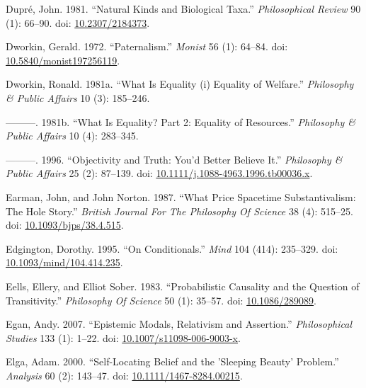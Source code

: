 \documentclass[
  10pt,
  letterpaper,
  DIV=11,
  numbers=noendperiod,
  twoside]{scrartcl}
\newlength{\cslhangindent}
\newenvironment{CSLReferences}[2] %
 {\begin{list}{}{%
  \setlength{\itemindent}{0pt}
  \setlength{\leftmargin}{0pt}
  \setlength{\parsep}{0pt}
  \ifodd #1
   \setlength{\leftmargin}{\cslhangindent}
   \setlength{\itemindent}{-1\cslhangindent}
  \fi
  \setlength{\itemsep}{#2\baselineskip}}}
 {\end{list}}
\begin{document}
\begin{CSLReferences}{1}{0}
Dupré, John. 1981. {``Natural Kinds and Biological Taxa.''}
\emph{Philosophical Review} 90 (1): 66--90. doi:
\href{https://doi.org/10.2307/2184373}{10.2307/2184373}.

Dworkin, Gerald. 1972. {``Paternalism.''} \emph{Monist} 56 (1): 64--84.
doi:
\href{https://doi.org/10.5840/monist197256119}{10.5840/monist197256119}.

Dworkin, Ronald. 1981a. {``What Is Equality (i) Equality of Welfare.''}
\emph{Philosophy \& Public Affairs} 10 (3): 185--246.

---------. 1981b. {``What Is Equality? Part 2: Equality of Resources.''}
\emph{Philosophy \& Public Affairs} 10 (4): 283--345.

---------. 1996. {``Objectivity and Truth: You'd Better Believe It.''}
\emph{Philosophy \& Public Affairs} 25 (2): 87--139. doi:
\href{https://doi.org/10.1111/j.1088-4963.1996.tb00036.x}{10.1111/j.1088-4963.1996.tb00036.x}.

Earman, John, and John Norton. 1987. {``What Price Spacetime
Substantivalism: The Hole Story.''} \emph{British Journal For The
Philosophy Of Science} 38 (4): 515--25. doi:
\href{https://doi.org/10.1093/bjps/38.4.515}{10.1093/bjps/38.4.515}.

Edgington, Dorothy. 1995. {``On Conditionals.''} \emph{Mind} 104 (414):
235--329. doi:
\href{https://doi.org/10.1093/mind/104.414.235}{10.1093/mind/104.414.235}.

Eells, Ellery, and Elliot Sober. 1983. {``Probabilistic Causality and
the Question of Transitivity.''} \emph{Philosophy Of Science} 50 (1):
35--57. doi: \href{https://doi.org/10.1086/289089}{10.1086/289089}.

Egan, Andy. 2007. {``Epistemic Modals, Relativism and Assertion.''}
\emph{Philosophical Studies} 133 (1): 1--22. doi:
\href{https://doi.org/10.1007/s11098-006-9003-x}{10.1007/s11098-006-9003-x}.

Elga, Adam. 2000. {``Self-Locating Belief and the 'Sleeping Beauty'
Problem.''} \emph{Analysis} 60 (2): 143--47. doi:
\href{https://doi.org/10.1111/1467-8284.00215}{10.1111/1467-8284.00215}.


\end{CSLReferences}
\end{document}
